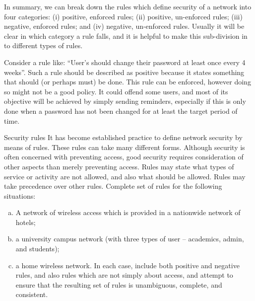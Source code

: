 In summary, we can break down the rules which define security of a network into four categories:
(i) positive, enforced rules; (ii) positive, un-enforced rules; (iii) negative, enforced rules;
and (iv) negative, un-enforced rules. Usually it will be clear in which category a rule falls,
and it is helpful to make this sub-division in to different types of rules.

Consider a rule like: ``User's should change their password at least once every 4 weeks''. Such a rule
should be described as positive because it states something that should (or perhaps must) be done.
This rule can be enforced, however doing so might not be a good policy. It could offend some users,
and most of its objective will be achieved by simply sending reminders, especially if this is only
done when a password has not been changed for at least the target period of time.

\begin{exercise}{Security rules}
It has become established practice to define network security by means of
rules. These rules can take many different forms. Although security is often concerned with preventing access, good security requires consideration of other aspects
than merely preventing access. Rules may state what types of service or activity are
not allowed, and also what should be allowed. Rules may take precedence over other
rules.
Complete set of rules for the following situations:
\begin{enumerate}[(a)]
\item A network of wireless access which is provided in a nationwide network of hotels;
\item a university campus network (with three types of user -- academics, admin, and
students);
\item a home wireless network.
In each case, include both positive and negative rules, and also rules which are 
not simply about access, and attempt to ensure that the resulting set of rules is unambiguous,
complete, and consistent.
\end{enumerate}
\end{exercise}

